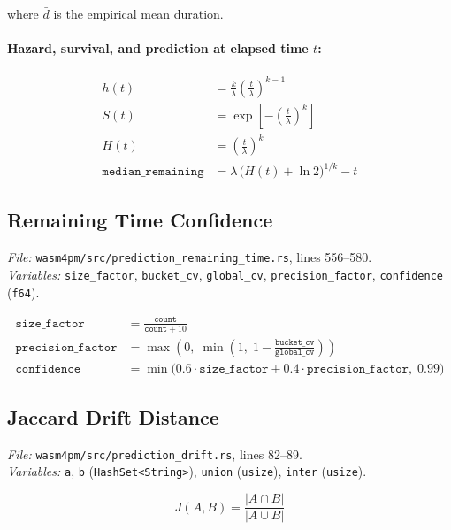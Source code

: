 \documentclass[11pt,a4paper]{article}
\begin{document}
where $\bar{d}$ is the empirical mean duration.

\paragraph{Hazard, survival, and prediction at elapsed time $t$:}
\begin{align}
  h(t) &= \frac{k}{\lambda}\left(\frac{t}{\lambda}\right)^{k-1} \\[6pt]
  S(t) &= \exp\!\left[-\left(\frac{t}{\lambda}\right)^k\right] \\[6pt]
  H(t) &= \left(\frac{t}{\lambda}\right)^k \\[6pt]
  \texttt{median\_remaining} &= \lambda\,\bigl(H(t) + \ln 2\bigr)^{1/k} - t
\end{align}

\subsection{Remaining Time Confidence}
\textit{File:} \texttt{wasm4pm/src/prediction\_remaining\_time.rs}, lines 556--580.\\
\textit{Variables:} \texttt{size\_factor}, \texttt{bucket\_cv}, \texttt{global\_cv}, \texttt{precision\_factor}, \texttt{confidence} (\texttt{f64}).

\begin{align}
  \texttt{size\_factor} &= \frac{\texttt{count}}{\texttt{count} + 10} \\[4pt]
  \texttt{precision\_factor} &= \max\!\left(0,\;\min\!\left(1,\;
    1 - \frac{\texttt{bucket\_cv}}{\texttt{global\_cv}}\right)\right) \\[4pt]
  \texttt{confidence} &= \min\!\bigl(0.6\cdot\texttt{size\_factor}
    + 0.4\cdot\texttt{precision\_factor},\;0.99\bigr)
\end{align}

\subsection{Jaccard Drift Distance}
\textit{File:} \texttt{wasm4pm/src/prediction\_drift.rs}, lines 82--89.\\
\textit{Variables:} \texttt{a}, \texttt{b} (\texttt{HashSet<String>}), \texttt{union} (\texttt{usize}), \texttt{inter} (\texttt{usize}).

\begin{equation}
  J(A,B) = \frac{|A \cap B|}{|A \cup B|}
\end{equation}
\end{document}
